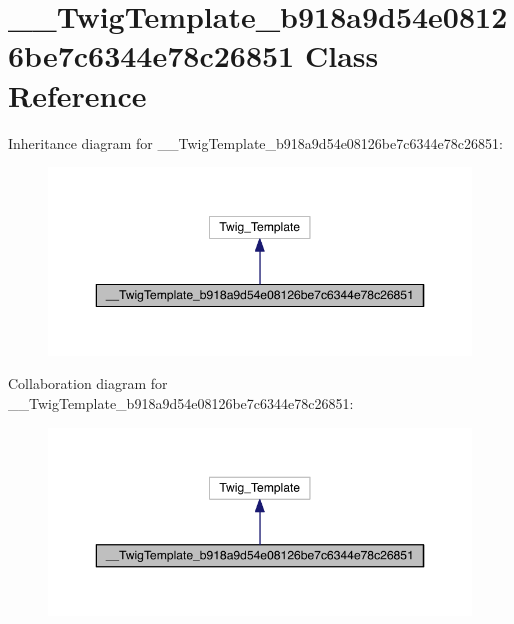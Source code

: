 \hypertarget{class_____twig_template__b918a9d54e08126be7c6344e78c26851}{\section{\-\_\-\-\_\-\-Twig\-Template\-\_\-b918a9d54e08126be7c6344e78c26851 Class Reference}
\label{class_____twig_template__b918a9d54e08126be7c6344e78c26851}
}


Inheritance diagram for \-\_\-\-\_\-\-Twig\-Template\-\_\-b918a9d54e08126be7c6344e78c26851\-:
\nopagebreak
\begin{figure}[H]
\begin{center}
\leavevmode
\includegraphics[width=350pt]{class_____twig_template__b918a9d54e08126be7c6344e78c26851__inherit__graph}
\end{center}
\end{figure}


Collaboration diagram for \-\_\-\-\_\-\-Twig\-Template\-\_\-b918a9d54e08126be7c6344e78c26851\-:
\nopagebreak
\begin{figure}[H]
\begin{center}
\leavevmode
\includegraphics[width=350pt]{class_____twig_template__b918a9d54e08126be7c6344e78c26851__coll__graph}
\end{center}
\end{figure}
